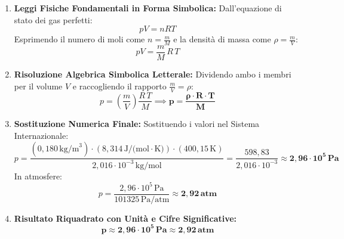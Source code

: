 \documentclass[11pt,a4paper,oneside]{report}
\begin{document}
\begin{problema}
\begin{enumerate}[label=\textbf{Fase \arabic*:}, leftmargin=*, itemsep=5pt]
\begin{center}
  \par{}
  \end{center}

  \item \textbf{Leggi Fisiche Fondamentali in Forma Simbolica:}
  Dall'equazione di stato dei gas perfetti:
  \[
  p V = n R T
  \]
  Esprimendo il numero di moli come $n = \frac{m}{M}$ e la densit\`a di massa come $\rho = \frac{m}{V}$:
  \[
  p V = \frac{m}{M} \, R \, T
  \]

  \item \textbf{Risoluzione Algebrica Simbolica Letterale:}
  Dividendo ambo i membri per il volume $V$ e raccogliendo il rapporto $\frac{m}{V} = \rho$:
  \[
  p = \left(\frac{m}{V}\right) \frac{R \, T}{M} \implies \mathbf{p = \frac{\rho \cdot R \cdot T}{M}}
  \]

  \item \textbf{Sostituzione Numerica Finale:}
  Sostituendo i valori nel Sistema Internazionale:
  \[
  p = \frac{(0{,}180\,\text{kg/m}^3) \cdot (8{,}314\,\text{J/(mol}\cdot\text{K)}) \cdot (400{,}15\,\text{K})}{2{,}016 \cdot 10^{-3}\,\text{kg/mol}} = \frac{598{,}83}{2{,}016 \cdot 10^{-3}} \approx \mathbf{2{,}96 \cdot 10^5\,\text{Pa}}
  \]
  In atmosfere:
  \[
  p = \frac{2{,}96 \cdot 10^5\,\text{Pa}}{101325\,\text{Pa/atm}} \approx \mathbf{2{,}92\,\text{atm}}
  \]

  \item \textbf{Risultato Riquadrato con Unit\`a e Cifre Significative:}
  \[
  \mathbf{\boxed{p \approx 2{,}96 \cdot 10^5\,\text{Pa} \approx 2{,}92\,\text{atm}}}
  \]


\end{enumerate}
\end{problema}
\end{document}
